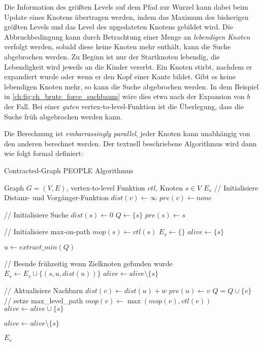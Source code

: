 Die Information des größten Levels auf dem Pfad zur Wurzel kann dabei beim Update eines Knotens übertragen werden, indem das Maximum des bisherigen größten Levels und das Level des upgedateten Knotens gebildet wird.
Die Abbruchbedingung kann durch Betrachtung einer Menge an \emph{lebendigen Knoten} verfolgt werden, sobald diese keine Knoten mehr enthält, kann die Suche abgebrochen werden.
Zu Beginn ist nur der Startknoten lebendig, die Lebendigkeit wird jeweils an die Kinder vererbt.
Ein Knoten stirbt, nachdem er expandiert wurde oder wenn er den Kopf einer Kante bildet.
Gibt es keine lebendigen Knoten mehr, so kann die Suche abgebrochen werden.
In dem Beispiel in \autoref{ch:fig:ch_brute_force_suchbaum} wäre dies etwa nach der Expansion von $b$ der Fall.
Bei einer \emph{guten} vertex-to-level-Funktion ist die Überlegung, dass die Suche früh abgebrochen werden kann.

Die Berechnung ist \emph{embarrassingly parallel}, jeder Knoten kann unabhängig von den anderen berechnet werden.
Der textuell beschriebene Algorithmus wird dann wie folgt formal definiert:

\begin{algorithm}[p]
  \caption{Contracted-Graph PEOPLE Algorithmus}
  \begin{algorithmic}[1]
    \Require Graph $G = (V, E)$, vertex-to-level Funktion ${vtl}$, Knoten $s \in V$
    \Ensure $E_s$
    \State // Initialisiere Distanz- und Vorgänger-Funktion
    \State ${dist}(v) \leftarrow \infty$
    \State ${pre}(v) \leftarrow {none}$
    \EndFor

    \State
    \State // Initialisiere Suche
    \State ${dist}(s) \leftarrow 0$
    \State $Q\leftarrow \{ s \}$
    \State ${pre}(s) \leftarrow s$

    \State
    \State // Initialisiere max-on-path
    \State ${mop}(s) \leftarrow {vtl}(s)$
    \State $E_s \leftarrow \{ \}$
    \State ${alive} \leftarrow \{ s \}$

    \State
    \State $u \leftarrow{extract\_min}(Q)$\label{graphs:dijkstra:pop}

    \State
    \State // Beende frühzeitig wenn Zielknoten gefunden wurde
    \State $E_s \leftarrow E_s \cup \{ (s, u, {dist}(u)) \}$
    \State ${alive} \leftarrow {alive} \setminus \{ s \}$
    \EndIf

    \State
    \State // Aktualisiere Nachbarn
    \State ${dist}(v) \leftarrow {dist}(u) + w$
    \State ${pre}(u) \leftarrow v$
    \State $Q = Q \cup \{ v \}$
    \State
    \State // setze max\_level\_path
    \State ${mop}(v) \leftarrow \max({mop}(v), {vtl}(v))$
    \State ${alive} \leftarrow {alive} \cup \{ s \}$
    \EndIf
    \EndIf
    \EndFor

    \State ${alive} \leftarrow {alive} \setminus \{ s \}$

    \EndWhile

    \State
    \State \Return $E_s$
  \end{algorithmic}
  \label{alg:people:ch}
\end{algorithm}

